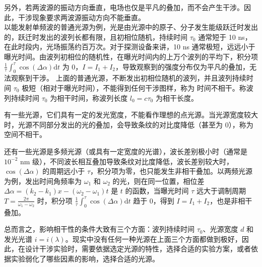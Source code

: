 \documentclass[UTF8]{report}
\theoremstyle{MyLineTheoremStyle} %
\theoremstyle{MyBlockTheoremStyle} %
\theoremstyle{MySubsubsectionStyle} %
\begin{document}
另外，若两波源的振动方向垂直，电场也仅是平凡的叠加，而不会产生干涉。因此，干涉现象要求两波源振动方向不能垂直。
\\


以能发射单频波的普通光源为例，光是由光源中的原子、分子发生能级跃迁时发出的，跃迁时发出的波列长都有限，且初相位随机，持续时间 $\tau_0$ 通常短于 10 ns，在此时段内，光场振荡约百万次。对于探测设备来讲，10 ns 通常极短，远远小于曝光时间。由波列初相位的随机性，在曝光时间内的上万个波列的平均下，积分项 $\frac{1}{\tau}\int_{0}^{\tau}  \cos(\Delta \alpha) \mathrm{d} t$ 为 0，$I = I_1 + I_2$，导致观察到的强度分布仅为平凡的叠加，无法观察到干涉。
上面的普通光源，不断发出初相位随机的波列，并且波列持续时间 $\tau_0$ 极短（相对于曝光时间），不能得到任何干涉图样，称为 {\color{red} 时间不相干}。称波列持续时间 $\tau_0$ 为相干时间，称波列长度 $l_0 = c \tau_0$ 为相干长度。

有一些光源，它们具有一定的发光宽度，不能看作理想的点光源。当光源宽度较大时，光源不同部分发出的光的叠加，会导致条纹的对比度降低（甚至为 0），称为 {\color{red} 空间不相干}。

还有一些光源是多频光源（或具有一定宽度的光谱），波长差别极小时（通常是 $10^{-2}$ nm 级），不同波长相互叠加导致条纹对比度降低，波长差别较大时，$\cos(\Delta \alpha)$ 的周期远小于 $\tau$，积分项为零，也只能发生非相干叠加。以两频光源为例，发出时间角频率为 $\omega_1$ 和 $\omega_2$ 的光，则在同一位置，相位差 $\Delta \alpha = (k_2 - k_1)x - (\omega_2 - \omega_1)t$ 是 $t$ 的函数，当曝光时间 $\tau$ 远大于调制周期 $T = \frac{2 \pi}{\omega_1 - \omega_2}$ 时，积分项 $\frac{1}{\tau}\int_{0}^{\tau}  \cos(\Delta \alpha) \mathrm{d} t$ 趋于 0，得到 $I = I_1 + I_2$，也是非相干叠加。

总而言之，影响相干性的条件大致有三个方面：波列持续时间 $\tau_0$、光源宽度 $d$ 和发光光谱 $i = i(\lambda)$。现实中没有任何一种光源在上面三个方面都做到极好，因此，在设计干涉实验时，需要依据选定光源的特性，选择合适的实验方案，或者依据实验弱化了哪些因素的影响，选择合适的光源。


\end{document}
